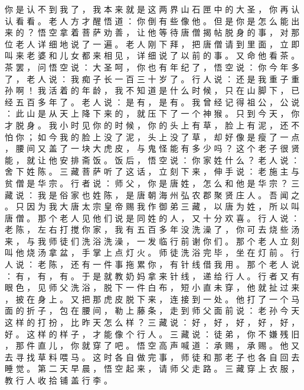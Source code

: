 {你 是 认 不 到 我 了 ， 我 本 来 就 是 这 两 界 山 石 匣 中 的 大 圣 ， 你 再 认 认 看 看 。
老 人 方 才 醒 悟 道 ： 你 倒 有 些 像 他 。
但 是 你 是 怎 么 能 出 来 的 ？ 悟 空 拿 着 菩 萨 劝 善 ， 让 他 等 待 唐 僧 揭 帖 脱 身 的 事 ， 对 那 位 老 人 详 细 地 说 了 一 遍 。
老 人 刚 下 拜 ， 把 唐 僧 请 到 里 面 ， 立 即 叫 来 老 婆 和 儿 女 都 来 相 见 ， 详 细 说 了 以 前 的 事 。
又 命 他 看 茶 。
茶 罢 ， 问 悟 空 说 ： 大 圣 呵 ， 你 也 有 年 纪 了 ， 悟 空 说 ： 你 今 年 多 了 ， 老 人 说 ： 我 痴 子 长 一 百 三 十 岁 了 。
行 人 说 ： 还 是 我 重 子 重 孙 啊 ！
我 活 着 的 年 龄 ， 我 不 知 道 是 什 么 时 候 ， 只 在 山 脚 下 ， 已 经 五 百 多 年 了 。
老 人 说 ： 是 有 ， 是 有 。
我 曾 经 记 得 祖 公 ， 公 说 ： 此 山 是 从 天 上 降 下 来 的 ， 就 压 下 了 一 个 神 猴 。
只 到 今 天 ， 你 才 脱 身 。
我 小 时 见 你 的 时 候 ， 你 的 头 上 有 草 ， 脸 上 有 泥 ， 还 不 怕 你 ； 如 今 我 的 脸 上 没 了 泥 ， 头 上 没 了 草 ， 却 好 像 是 瘦 了 一 点 ， 腰 间 又 盖 了 一 块 大 虎 皮 ， 与 鬼 怪 能 有 多 少 吗 ？
这 个 老 子 很 贤 能 ， 就 让 他 安 排 斋 饭 。
饭 后 ， 悟 空 说 ： 你 家 姓 什 么 ？ 老 人 说 ： 舍 下 姓 陈 。
三 藏 菩 萨 听 了 这 话 ， 立 刻 下 来 ， 伸 手 说 ： 老 施 主 与 贫 僧 是 华 宗 。
行 者 说 ： 师 父 ， 你 是 唐 姓 ， 怎 么 和 他 是 华 宗 ？ 三 藏 说 ： 我 是 俗 家 也 姓 陈 ， 是 唐 朝 海 州 弘 农 郡 聚 贤 庄 人 。
吾 闻 之 。
只 因 为 我 大 唐 太 宗 皇 帝 赐 我 作 御 弟 三 藏 ， 以 唐 为 姓 ， 所 以 叫 唐 僧 。
那 个 老 人 见 他 们 说 是 同 姓 的 人 ， 又 十 分 欢 喜 。
行 人 说 ： 老 陈 ， 左 右 打 搅 你 家 ， 我 有 五 百 多 年 没 洗 澡 了 ， 你 可 去 烧 些 汤 来 ， 与 我 师 徒 们 洗 浴 洗 澡 ， 一 发 临 行 前 谢 你 们 。
那 个 老 人 立 刻 叫 他 烧 汤 拿 盆 ， 手 掌 上 点 灯 火 。
师 徒 洗 浴 完 毕 ， 坐 在 灯 前 。
行 人 说 ： 老 陈 ， 还 有 一 件 事 拖 累 你 ， 有 针 线 借 我 用 。
那 个 老 人 说 ： 有 ， 有 ， 有 。
于 是 就 教 奶 妈 拿 来 针 线 ， 递 给 行 人 。
行 者 又 有 眼 色 ， 见 师 父 洗 浴 ， 脱 下 一 件 白 布 ， 短 小 直 未 穿 ， 他 就 扯 过 来 ， 披 在 身 上 。
又 把 那 虎 皮 脱 下 来 ， 连 接 到 一 处 。
他 打 了 一 个 马 面 的 折 子 ， 包 在 腰 间 ， 勒 上 藤 条 ， 走 到 师 父 面 前 说 ： 老 孙 今 天 这 样 的 打 扮 ， 比 昨 天 怎 么 样 ？ 三 藏 说 ： 好 ， 好 ， 好 ， 好 ， 好 ， 好 。
这 样 的 样 子 ， 才 能 像 个 行 人 。
三 藏 说 ： 徒 弟 ， 你 不 嫌 残 旧 ， 那 件 直 儿 ， 你 就 穿 了 吧 。
悟 空 高 声 喊 道 ： 承 赐 ， 承 赐 。
他 又 去 寻 找 草 料 喂 马 。
这 时 各 自 做 完 事 ， 师 徒 和 那 老 子 也 各 自 回 去 睡 觉 。
第 二 天 早 晨 ， 悟 空 起 来 ， 请 师 父 走 路 。
三 藏 穿 上 衣 服 ， 教 行 人 收 拾 铺 盖 行 李 。
}
